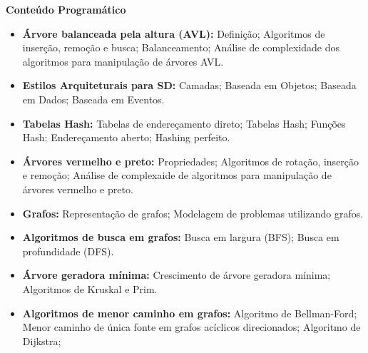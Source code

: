 
\begin{snugshade}\begin{center}\textbf{
    Conteúdo Programático
}\end{center}\end{snugshade}

\begin{itemize}

 \item \textbf{\'Arvore balanceada pela altura (AVL):} Defini\c{c}\~ao; Algoritmos de inser\c{c}\~ao, remo\c{c}\~ao e busca; Balanceamento; An\'alise de complexidade dos algoritmos para manipula\c{c}\~ao de \'arvores AVL.

 \item \textbf{Estilos Arquiteturais para SD:} Camadas; Baseada em Objetos; Baseada em Dados; Baseada em Eventos.

 \item \textbf{Tabelas Hash:} Tabelas de endere\c{c}amento direto; Tabelas Hash; Fun\c{c}\~oes Hash; Endere\c{c}amento aberto; Hashing perfeito.

 \item \textbf{\'Arvores vermelho e preto:} Propriedades; Algoritmos de rota\c{c}\~ao, inser\c{c}\~ao e remo\c{c}\~ao; An\'alise de complexaide de algoritmos para manipula\c{c}\~ao de \'arvores vermelho e preto.

 \item \textbf{Grafos:} Representa\c{c}\~ao de grafos; Modelagem de problemas utilizando grafos.

 \item \textbf{Algoritmos de busca em grafos:} Busca em largura (BFS); Busca em profundidade (DFS).

 \item \textbf{\'Arvore geradora m\'inima:} Crescimento de \'arvore geradora m\'inima; Algoritmos de Kruskal e Prim.

 \item \textbf{Algoritmos de menor caminho em grafos:} Algoritmo de Bellman-Ford; Menor caminho de \'unica fonte em grafos ac\'iclicos direcionados; Algoritmo de Dijkstra; 

\end{itemize}


%
%
%


